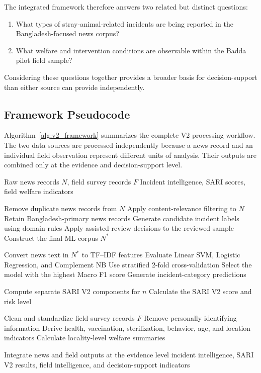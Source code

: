 \documentclass[conference]{IEEEtran}
\begin{document}
The integrated framework therefore answers two related but distinct
questions:

\begin{enumerate}
    \item What types of stray-animal-related incidents are being reported in
    the Bangladesh-focused news corpus?

    \item What welfare and intervention conditions are observable within the
    Badda pilot field sample?
\end{enumerate}

Considering these questions together provides a broader basis for
decision-support than either source can provide independently.

\subsection{Framework Pseudocode}

Algorithm~\ref{alg:v2_framework} summarizes the complete V2 processing
workflow. The two data sources are processed independently because a news
record and an individual field observation represent different units of
analysis. Their outputs are combined only at the evidence and
decision-support level.

\begin{algorithm}[!t]
\caption{V2 Dual-Source Stray Animal Welfare Intelligence Framework}
\label{alg:v2_framework}
\begin{algorithmic}[1]
\Require Raw news records $N$, field survey records $F$
\Ensure Incident intelligence, SARI scores, field welfare indicators

\State Remove duplicate news records from $N$
\State Apply content-relevance filtering to $N$
\State Retain Bangladesh-primary news records
\State Generate candidate incident labels using domain rules
\State Apply assisted-review decisions to the reviewed sample
\State Construct the final ML corpus $N^{*}$

\State Convert news text in $N^{*}$ to TF--IDF features
\State Evaluate Linear SVM, Logistic Regression, and Complement NB
\State Use stratified 2-fold cross-validation
\State Select the model with the highest Macro F1 score
\State Generate incident-category predictions

    \State Compute separate SARI V2 components for $n$
    \State Calculate the SARI V2 score and risk level
\EndFor

\State Clean and standardize field survey records $F$
\State Remove personally identifying information
\State Derive health, vaccination, sterilization, behavior,
       age, and location indicators
\State Calculate locality-level welfare summaries

\State Integrate news and field outputs at the evidence level
\State \Return incident intelligence, SARI V2 results,
       field intelligence, and decision-support indicators

\end{algorithmic}
\end{algorithm}
\end{document}
